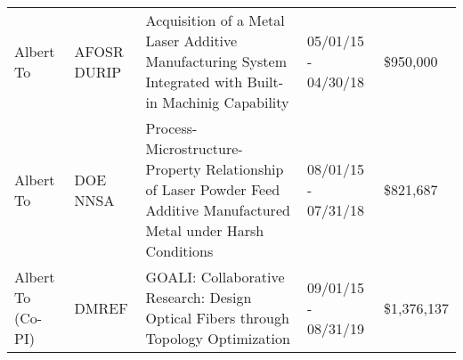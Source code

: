 \begin{tabularx}{\textwidth}{@{}L{1.25in}L{72pt}XR{48pt}R{50pt}@{}}
    Albert To & AFOSR DURIP & Acquisition of a Metal Laser Additive
    Manufacturing System Integrated with Built-in Machinig Capability
    & 05/01/15 - 04/30/18 & \$950,000 \\

    Albert To & DOE NNSA & Process-Microstructure-Property
    Relationship of Laser Powder Feed Additive Manufactured Metal
    under Harsh Conditions & 08/01/15 - 07/31/18 & \$821,687 \\

    Albert To (Co-PI) & DMREF & GOALI: Collaborative Research: Design
    Optical Fibers through Topology Optimization & 09/01/15 - 08/31/19
    & \$1,376,137 \\

\end{tabularx}
\bigskip


